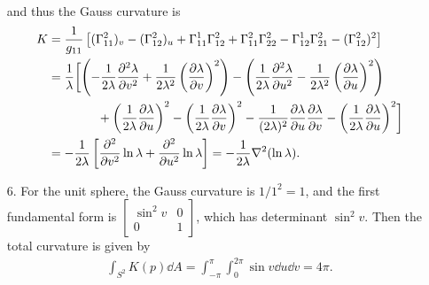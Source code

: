 \documentclass[a4paper,12pt]{article}
\theoremstyle{remark}
\begin{document}
\begin{enumerate}
\begin{gather*}
        \end{gather*}
        and thus the Gauss curvature is
        \begin{align*}
            K &= \frac{1}{g_{11}} \left[ (\Gamma_{11}^2)_v - (\Gamma_{12}^2)_u + \Gamma_{11}^1 \Gamma_{12}^2 + \Gamma_{11}^2 \Gamma_{22}^2 - \Gamma_{12}^1 \Gamma_{21}^2 - (\Gamma_{12}^2)^2 \right] \\
            &= \frac{1}{\lambda} \biggl[ \left( -\frac{1}{2\lambda} \pdv[2]{\lambda}{v} + \frac{1}{2\lambda^2} \left( \pdv{\lambda}{v} \right)^2 \right) - \left( \frac{1}{2\lambda} \pdv[2]{\lambda}{u} - \frac{1}{2\lambda^2} \left( \pdv{\lambda}{u} \right)^2 \right) \\
            &\qquad\qquad+ \left( \frac{1}{2\lambda} \pdv{\lambda}{u} \right)^2 - \left( \frac{1}{2\lambda} \pdv{\lambda}{v} \right)^2 - \frac{1}{(2\lambda)^2} \pdv{\lambda}{u} \pdv{\lambda}{v} - \left( \frac{1}{2\lambda} \pdv{\lambda}{u} \right)^2 \biggr] \\
            &= -\frac{1}{2\lambda} \left[ \frac{\partial^2}{\partial v^2}\ln\lambda + \frac{\partial^2}{\partial u^2}\ln\lambda \right] = -\frac{1}{2\lambda} \nabla^2(\ln\lambda).
        \end{align*}

    \item[6.]
        For the unit sphere, the Gauss curvature is $1/1^2 = 1$, and the first fundamental form is $\left[ \begin{array}{cc}
                \sin^2 v & 0 \\
                0 & 1
        \end{array} \right]$, which has determinant $\sin^2 v$. Then the total curvature is given by
        \begin{align*}
            \int_{S^2} K(p) \dd{A} = \int_{-\pi}^\pi \int_0^{2\pi} \sin v \dd{u} \dd{v} = 4\pi.
        \end{align*}
\end{enumerate}
\end{document}
